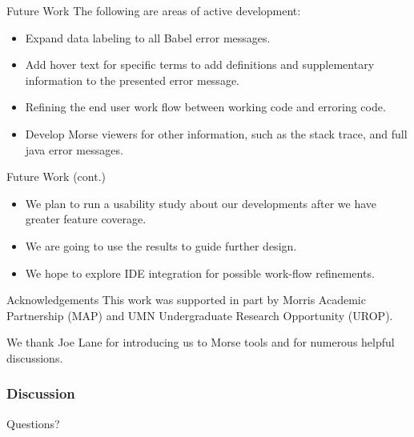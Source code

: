 \documentclass{beamer}
\begin{document}
\begin{frame}{Future Work}
  The following are areas of active development:
  \begin{itemize}
    \item<1-> Expand data labeling to all Babel error messages.
    \item<2-> Add hover text for specific terms to add definitions and supplementary information to the presented error message.
    \item<3-> Refining the end user work flow between working code and erroring code.
    \item<4-> Develop Morse viewers for other information, such as the stack trace, and full java error messages.
  \end{itemize}
  \end{frame}

\begin{frame}{Future Work (cont.)}
  \begin{itemize}
    \item<1-> We plan to run a usability study about our developments after we have greater feature coverage.
    \item<2-> We are going to use the results to guide further design.
    \item<3-> We hope to explore IDE integration for possible work-flow refinements.
  \end{itemize}
\end{frame}

\begin{frame}{Acknowledgements}
This work was supported in part by Morris Academic Partnership (MAP) and UMN Undergraduate Research Opportunity (UROP).  \\ 

\vspace*{0.2in}

We thank Joe Lane for introducing us to Morse tools and for numerous helpful discussions.
\end{frame}

\begin{frame}
  \frametitle{Discussion}
Questions?
\end{frame}
\end{document}
